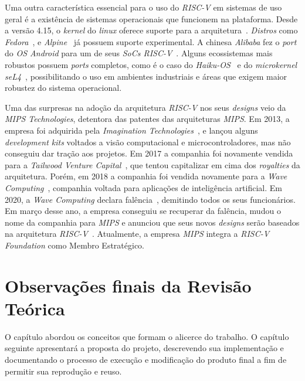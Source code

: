 { Uma outra característica essencial para o uso do \textit{RISC-V} em sistemas
    de uso geral é a existência de sistemas operacionais que funcionem na
    plataforma. Desde a versão 4.15, o \textit{kernel} do \textit{linux}
    oferece suporte para a arquitetura~\cite{linux_kernel}. \textit{Distros}
    como \textit{Fedora}~\cite{fedora_experimental},
    e \textit{Alpine}~\cite{alpine_experimental} já possuem suporte experimental.
    A chinesa \textit{Alibaba} fez o \textit{port} do \textit{OS Android}
    para um de seus \textit{SoCs RISC-V}~\cite{alibaba_android}. Alguns
    ecossistemas mais robustos possuem \textit{ports} completos, como é o
    caso do \textit{Haiku-OS}~\cite{haiku_riscv} e do \textit{microkernel
    seL4}~\cite{sel4_riscv}, possibilitando o uso em ambientes industriais
    e áreas que exigem maior robustez do sistema operacional.
}

{ Uma das surpresas na adoção da arquitetura \textit{RISC-V} nos seus
    \textit{designs} veio da \textit{MIPS Technologies}, detentora das
    patentes das arquiteturas \textit{MIPS}. Em 2013, a empresa foi adquirida
    pela \textit{Imagination Technologies}~\cite{imagination_technologies_acq},
    e lançou alguns \textit{development kits} voltados a visão computacional
    e microcontroladores, mas não conseguiu dar tração aos projetos.
    Em 2017 a companhia foi novamente vendida para a \textit{Tailwood
    Venture Capital}~\cite{tailwood_acq}, que tentou capitalizar em cima dos
    \textit{royalties} da arquitetura. Porém, em 2018 a companhia foi vendida
    novamente para a \textit{Wave Computing}~\cite{wave_comp_acq}, companhia
    voltada para aplicações de inteligência artificial. Em 2020, a
    \textit{Wave Computing} declara falência~\cite{wave_comp_bankrupt},
    demitindo todos os seus funcionários. Em março desse ano, a empresa
    conseguiu se recuperar da falência, mudou o nome da companhia para
    \textit{MIPS} e anunciou que seus novos \textit{designs} serão baseados
    na arquitetura \textit{RISC-V}~\cite{mips_reborn}. Atualmente, a empresa
    \textit{MIPS} integra a \textit{RISC-V Foundation} como Membro Estratégico.
}


\section{Observações finais da Revisão Teórica}
{ O capítulo abordou os conceitos que formam o alicerce do trabalho. O capítulo
    seguinte apresentará a proposta do projeto, descrevendo sua implementação
    e documentando o processo de execução e modificação do produto final a fim
    de permitir sua reprodução e reuso.
}

